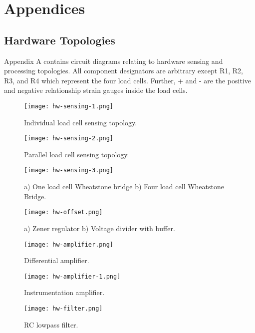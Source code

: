 
\part{Appendices}

\chapter{Hardware Topologies}

Appendix A contains circuit diagrams relating to hardware sensing and processing topologies. All component designators are arbitrary except R1, R2, R3, and R4 which represent the four load cells. Further, + and - are the positive and negative relationship strain gauges inside the load cells.

\begin{figure}[!ht]
	\centering
	\texttt{[image: hw-sensing-1.png]}
	\caption{Individual load cell sensing topology.}
	\label{fig:sense-1}
\end{figure}

\begin{figure}[!ht]
	\centering
	\texttt{[image: hw-sensing-2.png]}
	\caption{Parallel load cell sensing topology.}
	\label{fig:sense-2}
\end{figure}

\begin{figure}[!ht]
	\centering
	\texttt{[image: hw-sensing-3.png]}
	\caption{a) One load cell Wheatstone bridge b) Four load cell Wheatstone Bridge.}
	\label{fig:sense-3}
\end{figure}

\begin{figure}[!ht]
	\centering
	\texttt{[image: hw-offset.png]}
	\caption{a) Zener regulator b) Voltage divider with buffer.}
	\label{fig:offset}
\end{figure}

\begin{figure}[!ht]
	\centering
	\texttt{[image: hw-amplifier.png]}
	\caption{Differential amplifier.}
	\label{fig:amplifier}
\end{figure}

\begin{figure}[!ht]
	\centering
	\texttt{[image: hw-amplifier-1.png]}
	\caption{Instrumentation amplifier.}
	\label{fig:amplifier-2}
\end{figure}

\begin{figure}[!ht]
	\centering
	\texttt{[image: hw-filter.png]}
	\caption{RC lowpass filter.}
	\label{fig:filter}
\end{figure}